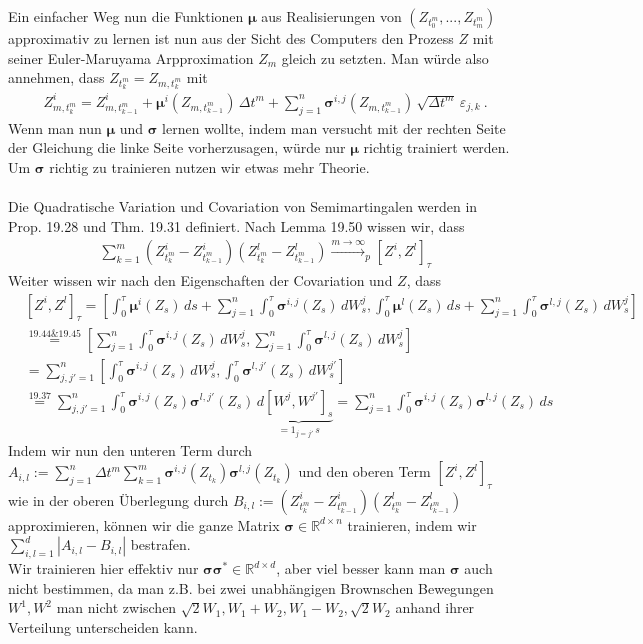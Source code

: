 \documentclass[12pt]{article}
\newcommand{\R}{\mathbb{R}}
\newcommand{\bmu}{\bm{\mu}}
\newcommand{\bsig}{\bm{\sigma}}
\begin{document}
	\newpage
	\noindent
	Ein einfacher Weg nun die Funktionen $\bmu$ aus Realisierungen von $(Z_{t^m_0},...,Z_{t^m_m})$ approximativ zu lernen ist nun aus der Sicht des Computers den Prozess $Z$ mit seiner Euler-Maruyama Arpproximation $Z_m$ gleich zu setzten. Man würde also annehmen, dass $Z_{t^m_k} = Z_{m,t^m_k}$ mit
	\begin{align*}
	& Z^i_{m,t^m_k} = Z^i_{m,t^m_{k-1}} + \bmu^i(Z_{m,t^m_{k-1}}) \, \Delta t^m + \sum\limits_{j=1}^n \bsig^{i,j}(Z_{m,t^m_{k-1}}) \, \sqrt{\Delta t^m} \, \varepsilon_{j,k} \ .
	\end{align*}
	Wenn man nun $\bmu$ und $\bsig$ lernen wollte, indem man versucht mit der rechten Seite der Gleichung die linke Seite vorherzusagen, würde nur $\bmu$ richtig trainiert werden. Um $\bsig$ richtig zu trainieren nutzen wir etwas mehr Theorie.\\
	\\
	Die Quadratische Variation und Covariation von Semimartingalen werden in \cite{PfaffiSkript} Prop. 19.28 und Thm. 19.31 definiert. Nach Lemma 19.50 wissen wir, dass
	\begin{align*}
	& \sum\limits_{k=1}^m (Z^i_{t^m_{k}}-Z^i_{t^m_{k-1}})(Z^l_{t^m_{k}}-Z^l_{t^m_{k-1}}) \xrightarrow{m \rightarrow \infty}_p [Z^i,Z^l]_\tau
	\end{align*}
	Weiter wissen wir nach den Eigenschaften der Covariation und $Z$, dass
	\begin{align*}
	& [Z^i,Z^l]_\tau = \left[ \int_0^\tau \bmu^i(Z_s) \, ds + \sum\limits_{j=1}^n \int_0^\tau \bsig^{i,j}(Z_s) \, dW_s^j, \int_0^\tau \bmu^l(Z_s) \, ds + \sum\limits_{j=1}^n \int_0^\tau \bsig^{l,j}(Z_s) \, dW_s^j \right]\\
	& \overset{19.44\&19.45}{=} \left[ \sum\limits_{j=1}^n \int_0^\tau \bsig^{i,j}(Z_s) \, dW_s^j, \sum\limits_{j=1}^n \int_0^\tau \bsig^{l,j}(Z_s) \, dW_s^j \right]\\
	& = \sum\limits_{j,j'=1}^n \left[ \int_0^\tau \bsig^{i,j}(Z_s) \, dW_s^j, \int_0^\tau \bsig^{l,j'}(Z_s) \, dW_s^{j'} \right]\\
	& \overset{19.37}{=} \sum\limits_{j,j'=1}^n \int_0^\tau \bsig^{i,j}(Z_s)\bsig^{l,j'}(Z_s) \, d\underbrace{\left[W^j, W^{j'} \right]_s}_{=1_{j=j'} \, s} = \sum\limits_{j=1}^n \int_0^\tau \bsig^{i,j}(Z_s)\bsig^{l,j}(Z_s) \, ds
	\end{align*}
	Indem wir nun den unteren Term durch $A_{i,l} := \sum\limits_{j=1}^n \Delta t^m \sum\limits_{k=1}^m \bsig^{i,j}(Z_{t_k})\bsig^{l,j}(Z_{t_k})$ und den oberen Term $[Z^i,Z^l]_\tau$ wie in der oberen Überlegung durch $B_{i,l} := (Z^i_{t^m_{k}}-Z^i_{t^m_{k-1}}) (Z^l_{t^m_{k}}-Z^l_{t^m_{k-1}})$ approximieren, können wir die ganze Matrix $\bsig \in \R^{d \times n}$ trainieren, indem wir $\sum\limits_{i,l=1}^d|A_{i,l}-B_{i,l}|$ bestrafen.\\
	Wir trainieren hier effektiv nur $\bsig \bsig^* \in \R^{d \times d}$, aber viel besser kann man $\bsig$ auch nicht bestimmen, da man z.B. bei zwei unabhängigen Brownschen Bewegungen $W^1,W^2$ man nicht zwischen $\sqrt{2}W_1, W_1+W_2, W_1-W_2, \sqrt{2}W_2$ anhand ihrer Verteilung unterscheiden kann.
	
\end{document}
